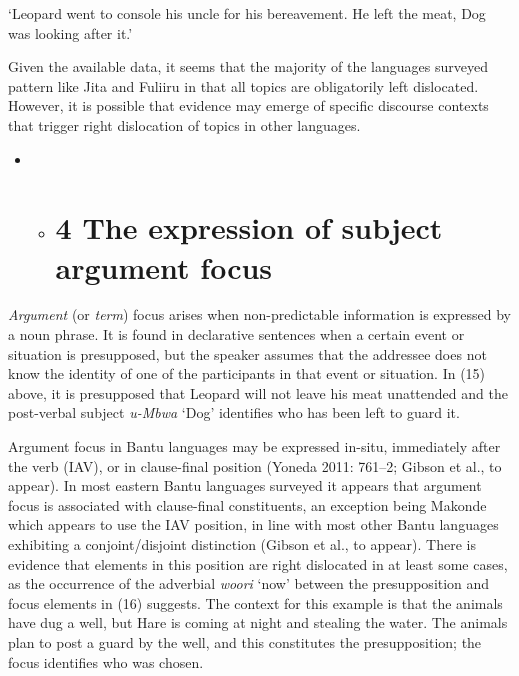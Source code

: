 \documentclass[output=paper]{langsci/langscibook}
\begin{document}
\begin{styleLangSciTranslation}
\glt \textup{‘Leopard went to console his uncle for his bereavement. He left}\textup{ the meat, Dog was looking after it}\textup{.’}
\z

Given the available data, it seems that the majority of the languages surveyed pattern like Jita and Fuliiru in that all topics are obligatorily left dislocated. However, it is possible that evidence may emerge of specific discourse contexts that trigger right dislocation of topics in other languages.

\begin{itemize}
\item \begin{itemize}
\item \chapter{4  The expression of subject argument focus}\end{itemize}
\end{itemize}

\textit{Argument} (or \textit{term}) focus arises when non-predictable information is expressed by a noun phrase. It is found in declarative sentences when a certain event or situation is presupposed, but the speaker assumes that the addressee does not know the identity of one of the participants in that event or situation. In (15) above, it is presupposed that Leopard will not leave his meat unattended and the post-verbal subject \textit{u}\textit{\nobreakdash-Mbwa} ‘Dog’ identifies who has been left to guard it.

Argument focus in Bantu languages may be expressed in-situ, immediately after the verb (IAV), or in clause-final position (Yoneda 2011: 761–2; Gibson et al., to appear). In most eastern Bantu languages surveyed it appears that argument focus is associated with clause-final constituents, an exception being Makonde which appears to use the IAV position, in line with most other Bantu languages exhibiting a conjoint/disjoint distinction (Gibson et al., to appear). There is evidence that elements in this position are right dislocated in at least some cases, as the occurrence of the adverbial \textit{woori} ‘now’ between the presupposition and focus elements in (16) suggests. The context for this example is that the animals have dug a well, but Hare is coming at night and stealing the water. The animals plan to post a guard by the well, and this constitutes the presupposition; the focus identifies who was chosen.


\end{styleLangSciTranslation}
\end{document}
